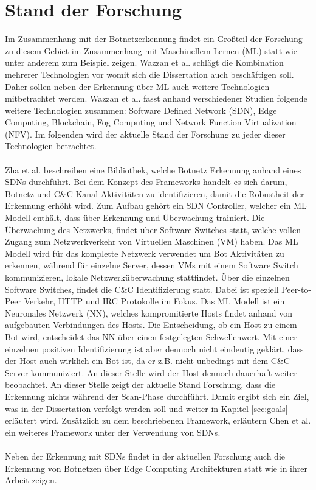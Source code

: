 \section{Stand der Forschung}
\label{sec:research}

Im Zusammenhang mit der Botnetzerkennung findet ein Großteil der Forschung zu diesem Gebiet im Zusammenhang mit Maschinellem Lernen (ML) statt wie
unter anderem zum Beispiel \cite{SAlrayes2022ModelingOB,DBLP:journals/comcom/Alani22,Habtamu2022ASR} zeigen.
Wazzan et al. \cite{Wazzan2021InternetOT} schlägt die Kombination mehrerer Technologien vor womit sich die Dissertation auch beschäftigen soll.
Daher sollen neben der Erkennung über ML auch weitere Technologien mitbetrachtet werden. Wazzan et al. fasst anhand verschiedener Studien folgende 
weitere Technologien zusammen: Software Defined Network (SDN), Edge Computing, Blockchain, Fog Computing und Network Function Virtualization (NFV). 
Im folgenden wird der aktuelle Stand der Forschung zu jeder dieser Technologien betrachtet. \\ \\ Zha et al. \cite{DBLP:conf/cns/Zha0GMC19} beschreiben 
eine Bibliothek, welche Botnetz Erkennung anhand eines SDNs durchführt. Bei dem Konzept des Frameworks handelt es sich darum, Botnetz und C\&C-Kanal Aktivitäten 
zu identifizieren, damit die Robustheit der Erkennung erhöht wird. Zum Aufbau gehört ein SDN Controller, welcher ein ML Modell enthält, dass über Erkennung und 
Überwachung trainiert. Die Überwachung des Netzwerks, findet über Software Switches statt, welche vollen Zugang zum Netzwerkverkehr von Virtuellen Maschinen (VM) haben.
Das ML Modell wird für das komplette Netzwerk verwendet um Bot Aktivitäten zu erkennen, während für einzelne Server, dessen VMs mit einem Software Switch kommunizieren, 
lokale Netzwerküberwachung stattfindet. Über die einzelnen Software Switches, findet die C\&C Identifizierung statt. Dabei ist speziell Peer-to-Peer Verkehr, HTTP und IRC
Protokolle im Fokus. Das ML Modell ist ein Neuronales Netzwerk (NN), welches kompromitierte Hosts findet anhand von aufgebauten Verbindungen des Hosts. Die Entscheidung, ob ein 
Host zu einem Bot wird, entscheidet das NN über einen festgelegten Schwellenwert. Mit einer einzelnen positiven Identifizierung ist aber dennoch nicht eindeutig geklärt, dass der
Host auch wirklich ein Bot ist, da er z.B. nicht unbedingt mit dem C\&C-Server kommuniziert. An dieser Stelle wird der Host dennoch dauerhaft weiter beobachtet. An dieser Stelle
zeigt der aktuelle Stand Forschung, dass die Erkennung nichts während der Scan-Phase durchführt. Damit ergibt sich ein Ziel, was in der Dissertation verfolgt werden soll und weiter
in Kapitel \ref{sec:goals} erläutert wird. Zusätzlich zu dem beschriebenen Framework, erläutern Chen et al. \cite{Chen2017BotGuardLR} ein weiteres Framework unter der Verwendung von 
SDNs. \\ \\ Neben der Erkennung mit SDNs findet in der aktuellen Forschung auch die Erkennung von Botnetzen über Edge Computing Architekturen statt wie \cite{gromov2022edge} in ihrer
Arbeit zeigen.
